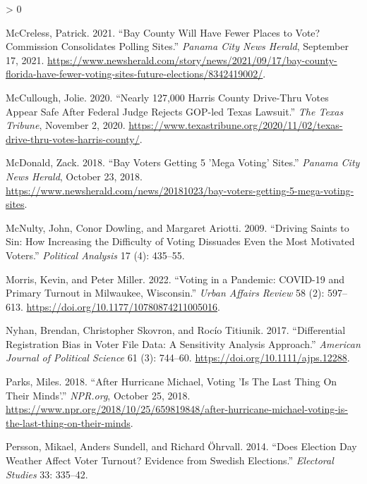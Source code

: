 \documentclass[
  12pt,
]{article}
\newlength{\cslhangindent}
\newenvironment{CSLReferences}[2] %
 {%
  \setlength{\parindent}{0pt}
  \ifodd #1 \everypar{\setlength{\hangindent}{\cslhangindent}}\ignorespaces\fi
  \ifnum #2 > 0
  \setlength{\parskip}{#2\baselineskip}
  \fi
 }%
 {}
\begin{document}
\begin{CSLReferences}{1}{0}
\leavevmode\hypertarget{ref-McCreless2021}{}%
McCreless, Patrick. 2021. {``Bay {County} Will Have Fewer Places to Vote? {Commission} Consolidates Polling Sites.''} \emph{Panama City News Herald}, September 17, 2021. \url{https://www.newsherald.com/story/news/2021/09/17/bay-county-florida-have-fewer-voting-sites-future-elections/8342419002/}.

\leavevmode\hypertarget{ref-McCullough2020}{}%
McCullough, Jolie. 2020. {``Nearly 127,000 {Harris County} Drive-Thru Votes Appear Safe After Federal Judge Rejects {GOP-led Texas} Lawsuit.''} \emph{The Texas Tribune}, November 2, 2020. \url{https://www.texastribune.org/2020/11/02/texas-drive-thru-votes-harris-county/}.

\leavevmode\hypertarget{ref-McDonald2018}{}%
McDonald, Zack. 2018. {``Bay Voters Getting 5 'Mega Voting' Sites.''} \emph{Panama City News Herald}, October 23, 2018. \url{https://www.newsherald.com/news/20181023/bay-voters-getting-5-mega-voting-sites}.

\leavevmode\hypertarget{ref-McNulty2009}{}%
McNulty, John, Conor Dowling, and Margaret Ariotti. 2009. {``Driving {Saints} to {Sin}: {How Increasing} the {Difficulty} of {Voting Dissuades Even} the {Most Motivated Voters}.''} \emph{Political Analysis} 17 (4): 435--55.

\leavevmode\hypertarget{ref-Morris2022}{}%
Morris, Kevin, and Peter Miller. 2022. {``Voting in a {Pandemic}: {COVID-19} and {Primary Turnout} in {Milwaukee}, {Wisconsin}.''} \emph{Urban Affairs Review} 58 (2): 597--613. \url{https://doi.org/10.1177/10780874211005016}.

\leavevmode\hypertarget{ref-Nyhan2017}{}%
Nyhan, Brendan, Christopher Skovron, and Rocío Titiunik. 2017. {``Differential {Registration Bias} in {Voter File Data}: {A Sensitivity Analysis Approach}.''} \emph{American Journal of Political Science} 61 (3): 744--60. \url{https://doi.org/10.1111/ajps.12288}.

\leavevmode\hypertarget{ref-Parks2018}{}%
Parks, Miles. 2018. {``After {Hurricane Michael}, {Voting} '{Is The Last Thing On Their Minds}'.''} \emph{NPR.org}, October 25, 2018. \url{https://www.npr.org/2018/10/25/659819848/after-hurricane-michael-voting-is-the-last-thing-on-their-minds}.

\leavevmode\hypertarget{ref-Persson2014}{}%
Persson, Mikael, Anders Sundell, and Richard Öhrvall. 2014. {``Does {Election Day Weather Affect Voter Turnout}? {Evidence} from {Swedish Elections}.''} \emph{Electoral Studies} 33: 335--42.


\end{CSLReferences}
\end{document}
